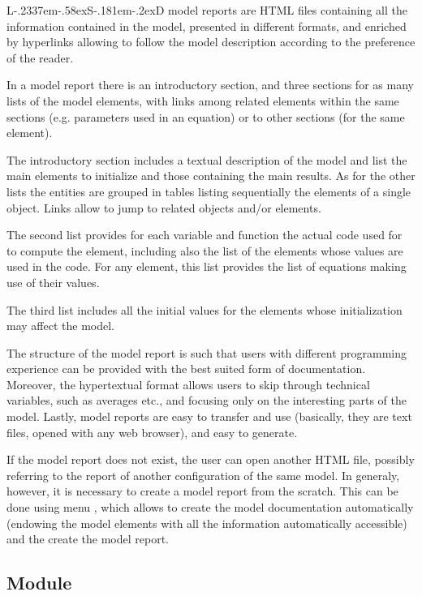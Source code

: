 \documentclass [11pt,a4paper] {book}
\def\LsD{{L\kern-.2337em\lower-.58ex\hbox{S}\kern-.181em\lower-.2ex\hbox{D}}\xspace}
\begin{document}
\LsD model reports are HTML files containing all the information contained in the model, presented in different formats, and enriched by hyperlinks allowing to follow the model description according to the preference of the reader.


In a model report there is an introductory section, and three sections for as many lists of the model elements, with  links among related elements within the same sections (e.g. parameters used in an equation) or to other sections (for the same element).

The introductory section includes a textual description of the model and list the main elements to initialize and those containing the main results. As for the other lists the entities are grouped in tables listing sequentially the elements of a single object. Links allow to jump to related objects and/or elements.

The second list provides for each variable and function the actual code used for to compute the element, including also the list of the elements whose values are used in the code. For any element, this list provides the list of equations making use of their values.

The third list includes all the initial values for the elements whose initialization may affect the model.

The structure of the model report is such that users with different programming experience can be provided with the best suited form of documentation. Moreover, the hypertextual format allows users to skip through technical variables, such as averages etc., and focusing only on the interesting parts of the model. Lastly, model reports are easy to transfer and use (basically, they are text files, opened with any web browser), and easy to generate.

If the model report does not exist, the user can open another HTML file, possibly referring to the report of another configuration of the same model. In generaly, however, it is necessary to create a model report from the scratch. This can be done using menu , which allows to create the model documentation automatically (endowing the model elements with all the information automatically accessible) and the create the model report.


\subsection{Module }\label{ssec:numobj}
\end{document}
